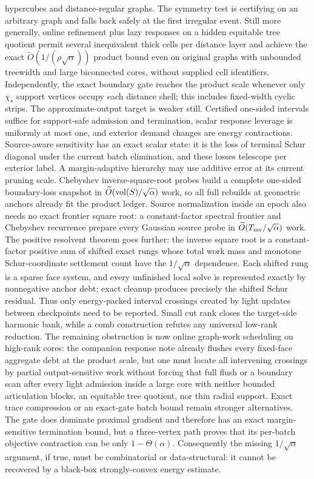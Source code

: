 hypercubes and distance-regular graphs.  The symmetry test is certifying on an
arbitrary graph and falls back safely at the first irregular event.  Still
more generally, online refinement plus lazy responses on a hidden equitable
tree quotient permit several inequivalent thick cells per distance layer and
achieve the
exact $\widetilde O(1/(\rho\sqrt\alpha))$ product bound even on original
graphs with unbounded treewidth and large biconnected cores, without supplied
cell identifiers.  Independently,
the exact boundary gate reaches the product scale whenever only
$\chi_\star$ support vertices
occupy each distance shell; this includes fixed-width cyclic strips.  The
approximate-output target is weaker still.  Certified one-sided intervals
suffice for support-safe admission and termination, scalar response leverage
is uniformly at most one, and exterior demand changes are energy contractions.
Source-aware sensitivity has an exact scalar state: it is the loss of terminal
Schur diagonal under the current batch elimination, and these losses telescope
per exterior label.  A margin-adaptive hierarchy may use additive error at its
current pruning scale.  Chebyshev inverse-square-root probes build a complete
one-sided boundary-loss snapshot in
$\widetilde O(\operatorname{vol}(S)/\sqrt\alpha)$ work, so all full rebuilds at geometric
anchors already fit the product ledger.  Source normalization inside an epoch
also needs no exact frontier square root: a constant-factor spectral frontier
and Chebyshev recurrence prepare every Gaussian source probe in
$\widetilde O(T_{\rm mv}/\sqrt\alpha)$ work.  The positive resolvent theorem
goes further: the inverse square root is a constant-factor positive sum of
shifted exact rungs whose total work mass and monotone Schur-coordinate
settlement count have the $1/\sqrt\alpha$ dependence.  Each shifted rung is a
sparse face system, and every unfinished local solve is represented exactly
by nonnegative anchor debt; exact cleanup produces precisely the shifted Schur
residual.  Thus only energy-packed interval crossings created by light updates
between checkpoints need to be reported.
Small cut rank closes the target-side harmonic bank, while a comb construction
refutes any universal low-rank reduction.  The remaining obstruction is now
online graph-work scheduling on high-rank cores: the companion response note
already flushes every fixed-face aggregate debt at the product scale, but one
must locate all intervening crossings by partial output-sensitive work without
forcing that full flush or a boundary scan after every light admission inside
a large core with neither bounded
articulation blocks, an equitable tree quotient, nor thin radial support.
Exact trace compression or
an exact-gate batch bound remain stronger alternatives.  The gate does
dominate proximal gradient and therefore has an exact margin-sensitive
termination bound, but a three-vertex path proves that its per-batch objective
contraction can be only $1-\Theta(\alpha)$.  Consequently the missing
$1/\sqrt\alpha$ argument, if true, must be combinatorial or data-structural:
it cannot be recovered by a black-box strongly-convex energy estimate.



